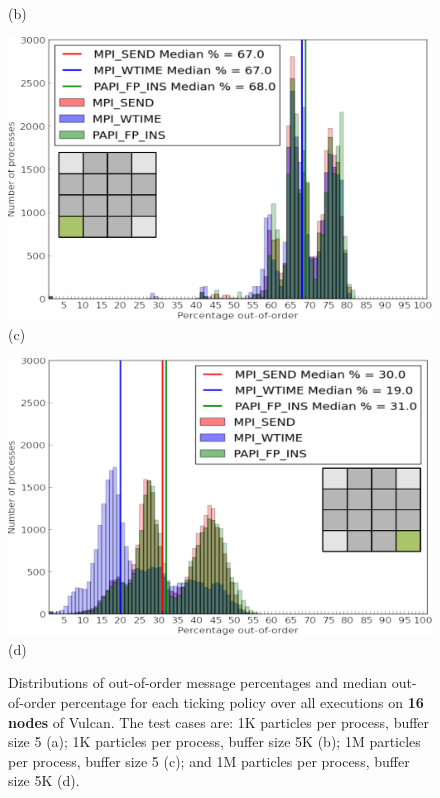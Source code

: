 \begin{figure}[!htb]
\begin{minipage}[b]{0.5\linewidth}
        \\ (b) \\
    \end{minipage}
    \begin{minipage}[b]{0.5\linewidth}
        \centering
        \includegraphics[width=0.95\linewidth]{chapter_3_figures/hist_nodes16_procs256_particles1000000_cycles10_bufferSize5.pdf}
       \\ (c) \\
    \end{minipage}
    \begin{minipage}[b]{0.5\linewidth}
        \centering
        \includegraphics[width=0.95\linewidth]{chapter_3_figures/hist_nodes16_procs256_particles1000000_cycles10_bufferSize5000.pdf}
        \\ (d) \\
    \end{minipage}
    \caption{Distributions of out-of-order message percentages and
      median out-of-order percentage for each ticking policy over all
      executions on \textbf{16 nodes} of Vulcan.
      The test cases are: 
      1K particles per process, buffer size 5 (a); 
      1K particles per process, buffer size 5K (b);
      1M particles per process, buffer size 5 (c);
      and 1M particles per process, buffer size 5K (d).}
    \label{fig:resutls16}  
\end{figure}

